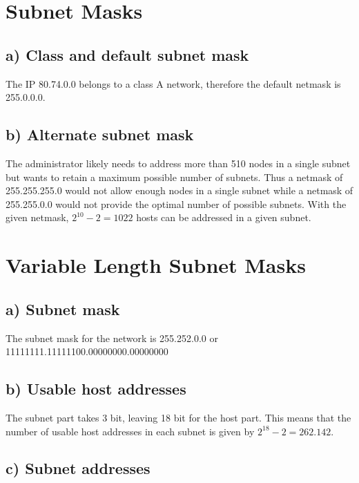 \documentclass[a4paper, 11 pt, article, accentcolor=tud7b]{tudreport}
\begin{document}
	\section{Subnet Masks}
	
	\subsection*{a) Class and default subnet mask}
	The IP 80.74.0.0 belongs to a class A network, therefore the default netmask is 255.0.0.0.
	
	\subsection*{b) Alternate subnet mask}
	The administrator likely needs to address more than 510 nodes in a single subnet but wants to retain a maximum possible number of subnets. Thus a netmask of 255.255.255.0 would not allow enough nodes in a single subnet while a netmask of 255.255.0.0 would not provide the optimal number of possible subnets. With the given netmask, $2^{10} - 2 = 1022$ hosts can be addressed in a given subnet.
	
	\section{Variable Length Subnet Masks}
	
	\subsection*{a) Subnet mask}
	
	The subnet mask for the network is 255.252.0.0 or 11111111.11111100.00000000.00000000
	
	\subsection*{b) Usable host addresses}
	The subnet part takes 3 bit, leaving 18 bit for the host part. This means that the number of usable host addresses in each subnet is given by $2^{18} - 2 = 262.142$.
	
	\newpage
	
	\subsection*{c) Subnet addresses}
	
\end{document}
